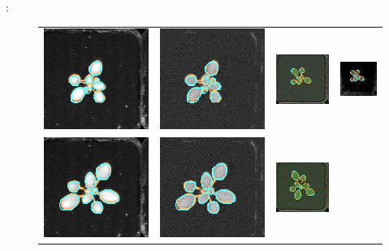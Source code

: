 \documentclass[11pt,letterpaper]{article}
\newenvironment{response}
{\noindent {\bf Response}: \color{black}}
{\color{black} \vspace{1.6em}}
\begin{document}
\begin{response}
\begin{figure}
\begin{centering}
\begin{tabular}{cccc}
\includegraphics[width=.18\textwidth]{../Figures/LabelAlignment/day_3_hour_23-seg_ir.png}&
\includegraphics[width=.18\textwidth]{../Figures/LabelAlignment/day_3_hour_23-seg_fmp.png}&
\includegraphics[width=.18\textwidth]{../Figures/LabelAlignment/day_3_hour_23-seg_rgb.png}&
\includegraphics[width=.18\textwidth]{../Figures/LabelAlignment/day_3_hour_23-seg_depth.png}\\
\includegraphics[width=.18\textwidth]{../Figures/LabelAlignment/day_5_hour_23-seg_ir.png}&
\includegraphics[width=.18\textwidth]{../Figures/LabelAlignment/day_5_hour_23-seg_fmp.png}&
\includegraphics[width=.18\textwidth]{../Figures/LabelAlignment/day_5_hour_23-seg_rgb.png}&

\end{tabular}
\end{centering}
\end{figure}
\end{response}
\end{document}
